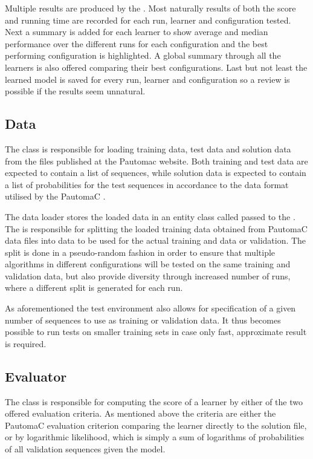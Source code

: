 Multiple results are produced by the . Most naturally results of both the score and running time are recorded for each run, learner and configuration tested. Next a summary is added for each learner to show average and median performance over the different runs for each configuration and the best performing configuration is highlighted. A global summary through all the learners is also offered comparing their best configurations. Last but not least the learned model is saved for every run, learner and configuration so a review is possible if the results seem unnatural.

\subsection{Data}
The  class is responsible for loading training data, test data and solution data from the files published at the Pautomac website. Both training and test data are expected to contain a list of sequences, while solution data is expected to contain a list of probabilities for the test sequences in accordance to the data format utilised by the PautomaC .

The data loader stores the loaded data in an entity class called  passed to the . The  is responsible for splitting the loaded training data obtained from PautomaC data files into data to be used for the actual training and data or validation. The split is done in a pseudo-random fashion in order to ensure that multiple algorithms in different configurations will be tested on the same training and validation data, but also provide diversity through increased number of runs, where a different split is generated for each run.

As aforementioned the test environment also allows for specification of a given number of sequences to use as training or validation data. It thus becomes possible to run tests on smaller training sets in case only fast, approximate result is required.

\subsection{Evaluator}
The  class is responsible for computing the score of a learner by either of the two offered evaluation criteria. As mentioned above the criteria are either the PautomaC evaluation criterion  comparing the learner directly to the solution file, or by logarithmic likelihood, which is simply a sum of logarithms of probabilities of all validation sequences given the model.

